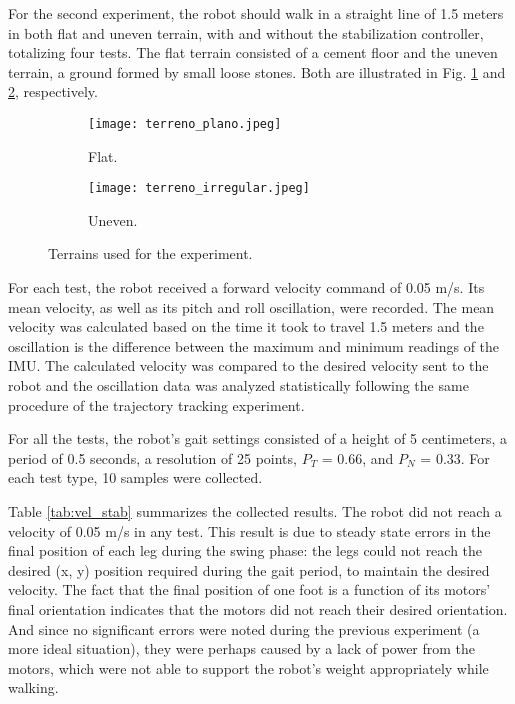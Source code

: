 \documentclass[conference]{IEEEtran}
\begin{document}
For the second experiment, the robot should walk in a straight line of 1.5 meters in both flat and uneven terrain, with and without the stabilization controller, totalizing four tests. The flat terrain consisted of a cement floor and the uneven terrain, a ground formed by small loose stones. Both are illustrated in Fig. \ref{fig:terreno_plano} and \ref{fig:terreno_uneven}, respectively.

\begin{figure}[tb]
  \centering
  \begin{subfigure}[htbp]{0.24\textwidth}
    \centering
    \texttt{[image: terreno\_plano.jpeg]}
    \caption{Flat.}
    \label{fig:terreno_plano}
  \end{subfigure}
  \begin{subfigure}[htbp]{0.24\textwidth}
    \centering
    \texttt{[image: terreno\_irregular.jpeg]}
    \caption{Uneven.}
    \label{fig:terreno_uneven}
  \end{subfigure}
  \vfill
  \caption{Terrains used for the experiment.}
  \label{fig:terrenos}
  \vspace{-\baselineskip}
\end{figure}

For each test, the robot received a forward velocity command of 0.05 m/s. Its mean velocity, as well as its pitch and roll oscillation, were recorded. The mean velocity was calculated based on the time it took to travel 1.5 meters and the oscillation is the difference between the maximum and minimum readings of the IMU. The calculated velocity was compared to the desired velocity sent to the robot and the oscillation data was analyzed statistically following the same procedure of the trajectory tracking experiment.

For all the tests, the robot's gait settings consisted of a height of 5 centimeters, a period of 0.5 seconds, a resolution of 25 points, $P_T$ = 0.66, and $P_N$ = 0.33. For each test type, 10 samples were collected.

Table \ref{tab:vel_stab} summarizes the collected results. The robot did not reach a velocity of 0.05 m/s in any test. This result is due to steady state errors in the final position of each leg during the swing phase: the legs could not reach the desired (x, y) position required during the gait period, to maintain the desired velocity. The fact that the final position of one foot is a function of its motors' final orientation indicates that the motors did not reach their desired orientation. And since no significant errors were noted during the previous experiment (a more ideal situation), they were perhaps caused by a lack of power from the motors, which were not able to support the robot's weight appropriately while walking.
\end{document}
